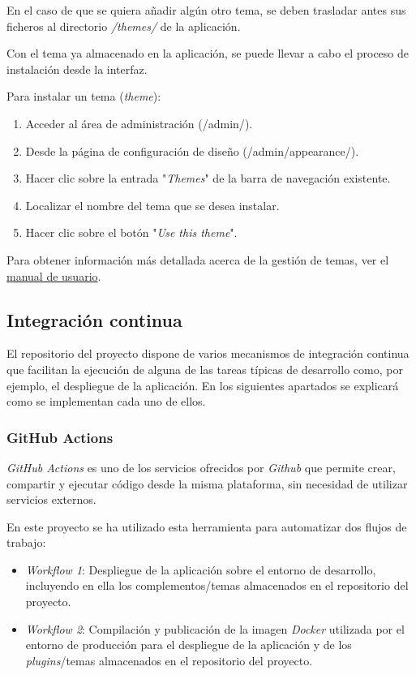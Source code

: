 En el caso de que se quiera añadir algún otro tema, se deben trasladar
antes sus ficheros al directorio \emph{/themes/} de la aplicación.

Con el tema ya almacenado en la aplicación, se puede llevar a cabo el
proceso de instalación desde la interfaz.

Para instalar un tema (\emph{theme}):

\begin{enumerate}
\def\labelenumi{\arabic{enumi}.}
\tightlist
\item
  Acceder al área de administración ({/admin/}).
\item
  Desde la página de configuración de diseño
  ({/admin/appearance/}).
\item
  Hacer clic sobre la entrada "\emph{Themes}" de la barra de navegación
  existente.
\item
  Localizar el nombre del tema que se desea instalar.
\item
  Hacer clic sobre el botón "\emph{Use this theme}".
\end{enumerate}

Para obtener información más detallada acerca de la gestión de temas,
ver el
\href{https://tfg-ceniehariadne.readthedocs.io/es/latest/anexos/E_Manual_usuario.html\#manual-de-usuario}{manual
de usuario}.

\subsection{Integración continua}

El repositorio del proyecto dispone de varios mecanismos de integración
continua que facilitan la ejecución de alguna de las tareas típicas de
desarrollo como, por ejemplo, el despliegue de la aplicación. En los
siguientes apartados se explicará como se implementan cada uno de ellos.

\subsubsection{GitHub Actions}

\emph{GitHub Actions} es uno de los servicios ofrecidos por
\emph{Github} que permite crear, compartir y ejecutar código desde la
misma plataforma, sin necesidad de utilizar servicios externos.

En este proyecto se ha utilizado esta herramienta para automatizar dos
flujos de trabajo:

\begin{itemize}
\tightlist
\item
  \emph{Workflow 1}: Despliegue de la aplicación sobre el entorno de
  desarrollo, incluyendo en ella los complementos/temas almacenados en
  el repositorio del proyecto.
\item
  \emph{Workflow 2}: Compilación y publicación de la imagen
  \emph{Docker} utilizada por el entorno de producción para el
  despliegue de la aplicación y de los \emph{plugins}/temas almacenados
  en el repositorio del proyecto.
\end{itemize}

